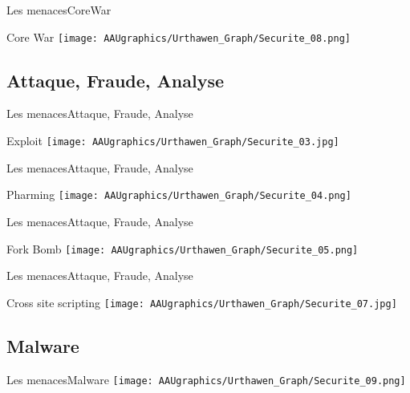 \documentclass[10pt]{beamer}
\begin{document}
\begin{frame}{Les menaces}{CoreWar}
  \begin{block}{Core War}
    \texttt{[image: AAUgraphics/Urthawen\_Graph/Securite\_08.png]}  
  \end{block}
\end{frame}

\subsection{Attaque, Fraude, Analyse}

\begin{frame}{Les menaces}{Attaque, Fraude, Analyse}
  \begin{block}{Exploit}
    \texttt{[image: AAUgraphics/Urthawen\_Graph/Securite\_03.jpg]}  
  \end{block}
\end{frame}


\begin{frame}{Les menaces}{Attaque, Fraude, Analyse}
  \begin{block}{Pharming}
    \texttt{[image: AAUgraphics/Urthawen\_Graph/Securite\_04.png]}    
  \end{block}
\end{frame}

\begin{frame}{Les menaces}{Attaque, Fraude, Analyse}
  \begin{block}{Fork Bomb}
    \texttt{[image: AAUgraphics/Urthawen\_Graph/Securite\_05.png]}    
  \end{block}
\end{frame}

\begin{frame}{Les menaces}{Attaque, Fraude, Analyse}
  \begin{block}{Cross site scripting}
    \texttt{[image: AAUgraphics/Urthawen\_Graph/Securite\_07.jpg]}    
  \end{block}
\end{frame}

\subsection{Malware}

\begin{frame}{{Les menaces}}{Malware}
    \texttt{[image: AAUgraphics/Urthawen\_Graph/Securite\_09.png]}  
\end{frame}
\end{document}
